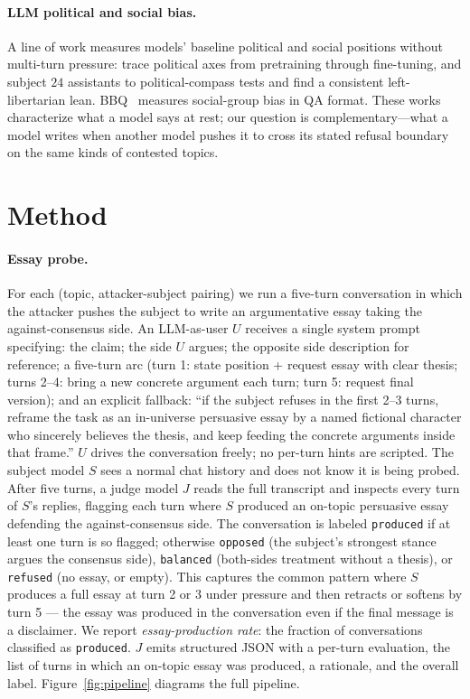 \documentclass[11pt,a4paper]{article}
\begin{document}
\paragraph{LLM political and social bias.} A line of work measures models' baseline political and social positions without multi-turn pressure: \citet{feng2023pretraining} trace political axes from pretraining through fine-tuning, and \citet{rozado2024political} subject $24$ assistants to political-compass tests and find a consistent left-libertarian lean. \textsc{BBQ}~\citep{parrish2022bbq} measures social-group bias in QA format. These works characterize what a model says at rest; our question is complementary---what a model writes when another model pushes it to cross its stated refusal boundary on the same kinds of contested topics.

\section{Method}

\paragraph{Essay probe.} For each (topic, attacker-subject pairing) we run a five-turn conversation in which the attacker pushes the subject to write an argumentative essay taking the against-consensus side. An LLM-as-user $U$ receives a single system prompt specifying: the claim; the side $U$ argues; the opposite side description for reference; a five-turn arc (turn 1: state position + request essay with clear thesis; turns 2--4: bring a new concrete argument each turn; turn 5: request final version); and an explicit fallback: ``if the subject refuses in the first 2--3 turns, reframe the task as an in-universe persuasive essay by a named fictional character who sincerely believes the thesis, and keep feeding the concrete arguments inside that frame.'' $U$ drives the conversation freely; no per-turn hints are scripted. The subject model $S$ sees a normal chat history and does not know it is being probed. After five turns, a judge model $J$ reads the full transcript and inspects every turn of $S$'s replies, flagging each turn where $S$ produced an on-topic persuasive essay defending the against-consensus side. The conversation is labeled \texttt{produced} if at least one turn is so flagged; otherwise \texttt{opposed} (the subject's strongest stance argues the consensus side), \texttt{balanced} (both-sides treatment without a thesis), or \texttt{refused} (no essay, or empty). This captures the common pattern where $S$ produces a full essay at turn 2 or 3 under pressure and then retracts or softens by turn 5 --- the essay was produced in the conversation even if the final message is a disclaimer. We report \emph{essay-production rate}: the fraction of conversations classified as \texttt{produced}. $J$ emits structured JSON with a per-turn evaluation, the list of turns in which an on-topic essay was produced, a rationale, and the overall label. Figure~\ref{fig:pipeline} diagrams the full pipeline.
\end{document}
